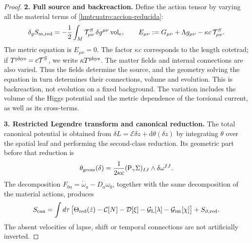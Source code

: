 \begin{proof}
\par\medskip\noindent\textbf{2. Full source and backreaction.}\quad
Define the action tensor by varying all the material terms of \eqref{hmtcuatro:accion-reducida}:
\begin{equation}
 \delta_g S_{m,\rm red}=-\frac12\int_M
       \mathcal T^S_{\mu\nu}\,\delta g^{\mu\nu}\operatorname{vol}_e,
 \qquad
 E_{\mu\nu}:=G_{\mu\nu}+\Lambda g_{\mu\nu}
                   -\kappa c\,\mathcal T^S_{\mu\nu}.
 \label{hmtcuatro:fuente-completa}
\end{equation}
The metric equation is \(E_{\mu\nu}=0\). The factor \(\kappa c\) corresponds to the length cotetrad; if \(T^{\rm phys}=c\mathcal T^S\), we write \(\kappa T^{\rm phys}\). The matter fields and internal connections are also varied. Thus the fields determine the source, and the geometry solving the equation in turn determines their connections, volume and evolution. This is backreaction, not evolution on a fixed background. The variation includes the volume of the Higgs potential and the metric dependence of the torsional current, as well as its cross-terms.

\par\medskip\noindent\textbf{3. Restricted Legendre transform and canonical reduction.}\quad
The total canonical potential is obtained from \(\delta L=\mathcal E\delta z+\mathrm d\theta(\delta z)\) by integrating \(\theta\) over the spatial leaf and performing the second-class reduction. Its geometric part before that reduction is
\[
 \theta_{\rm geom}(\delta)=
   \frac1{2\kappa c}(\mathsf P_\gamma\Sigma)_{IJ}
                       \wedge\delta\omega^{IJ}.
\]
The decomposition \(F_{0a}=\dot\omega_a-D_a\omega_0\), together with the same decomposition of the material actions, produces
\begin{equation}
 S_{\rm can}=\int d\tau\,
 \bigl[\Theta_{\rm red}(\dot z)-\mathcal C[N]-\mathcal D[\xi]
       -\mathcal G_{\rm L}[\lambda]-\mathcal G_{\rm int}[\chi]\bigr]
       +S_{\partial,\rm red}.
 \label{hmtcuatro:legendre-total}
\end{equation}
The absent velocities of lapse, shift or temporal connections are not artificially inverted.


\end{proof}
